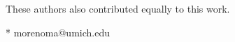 \begin{flushleft}
\ddag These authors also contributed equally to this work.




* morenoma@umich.edu

\end{flushleft}
